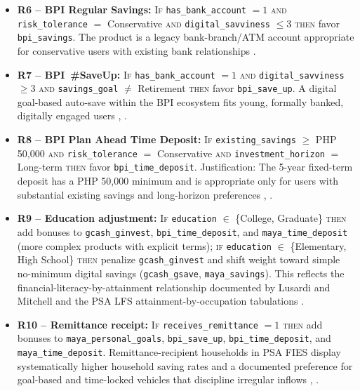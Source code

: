 \documentclass[journal]{./IEEE/IEEEtran}
\begin{document}
\begin{itemize}
    \item \textbf{R6 -- BPI Regular Savings:} \textsc{If} \texttt{has\_bank\_account} $= 1$ \textsc{and} \texttt{risk\_tolerance} $=$ Conservative \textsc{and} \texttt{digital\_savviness} $\leq 3$ \textsc{then} favor \texttt{bpi\_savings}. The product is a legacy bank-branch/ATM account appropriate for conservative users with existing bank relationships \cite{ref37b}.
    \item \textbf{R7 -- BPI~\#SaveUp:} \textsc{If} \texttt{has\_bank\_account} $= 1$ \textsc{and} \texttt{digital\_savviness} $\geq 3$ \textsc{and} \texttt{savings\_goal} $\neq$ Retirement \textsc{then} favor \texttt{bpi\_save\_up}. A digital goal-based auto-save within the BPI ecosystem fits young, formally banked, digitally engaged users \cite{ref37b}, \cite{ref63}.
    \item \textbf{R8 -- BPI Plan Ahead Time Deposit:} \textsc{If} \texttt{existing\_savings} $\geq$ PHP 50{,}000 \textsc{and} \texttt{risk\_tolerance} $=$ Conservative \textsc{and} \texttt{investment\_horizon} $=$ Long-term \textsc{then} favor \texttt{bpi\_time\_deposit}. Justification: The 5-year fixed-term deposit has a PHP 50{,}000 minimum and is appropriate only for users with substantial existing savings and long-horizon preferences \cite{ref37b}, \cite{ref64}.
    \item \textbf{R9 -- Education adjustment:} \textsc{If} \texttt{education} $\in$ \{College, Graduate\} \textsc{then} add bonuses to \texttt{gcash\_ginvest}, \texttt{bpi\_time\_deposit}, and \texttt{maya\_time\_deposit} (more complex products with explicit terms); \textsc{if} \texttt{education} $\in$ \{Elementary, High School\} \textsc{then} penalize \texttt{gcash\_ginvest} and shift weight toward simple no-minimum digital savings (\texttt{gcash\_gsave}, \texttt{maya\_savings}). This reflects the financial-literacy-by-attainment relationship documented by Lusardi and Mitchell \cite{ref43} and the PSA LFS attainment-by-occupation tabulations \cite{ref41}.
    \item \textbf{R10 -- Remittance receipt:} \textsc{If} \texttt{receives\_remittance} $= 1$ \textsc{then} add bonuses to \texttt{maya\_personal\_goals}, \texttt{bpi\_save\_up}, \texttt{bpi\_time\_deposit}, and \texttt{maya\_time\_deposit}. Remittance-recipient households in PSA FIES \cite{ref40} display systematically higher household saving rates and a documented preference for goal-based and time-locked vehicles that discipline irregular inflows \cite{ref35}, \cite{ref63}.
\end{itemize}
\end{document}

